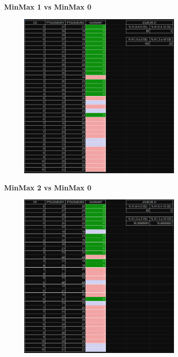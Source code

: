 \centering \textbf{MinMax 1 vs MinMax 0}
\begin{figure}[!ht]
\begin{center}
\includegraphics[width=0.70\textwidth]{./TABLEURDEEP1}
\end{center}
\end{figure}
\newpage


\centering \textbf{MinMax 2 vs MinMax 0}
\begin{figure}[!ht]
\begin{center}
\includegraphics[width=0.70\textwidth]{./TABLEURDEEP2}
\end{center}
\end{figure}
\newpage

